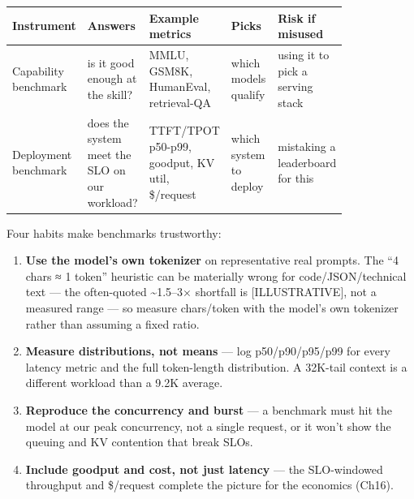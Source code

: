 \nopagebreak[4]
\begin{longtable}[]{@{}
  >{\raggedright\arraybackslash}p{0.1647\linewidth}
  >{\raggedright\arraybackslash}p{0.1647\linewidth}
  >{\raggedright\arraybackslash}p{0.1647\linewidth}
  >{\raggedright\arraybackslash}p{0.1647\linewidth}
  >{\raggedright\arraybackslash}p{0.1647\linewidth}@{}}
\toprule\noalign{}
\begin{minipage}[b]{\linewidth}\raggedright
Instrument
\end{minipage} & \begin{minipage}[b]{\linewidth}\raggedright
Answers
\end{minipage} & \begin{minipage}[b]{\linewidth}\raggedright
Example metrics
\end{minipage} & \begin{minipage}[b]{\linewidth}\raggedright
Picks
\end{minipage} & \begin{minipage}[b]{\linewidth}\raggedright
Risk if misused
\end{minipage} \\
\midrule\noalign{}
\endhead
\bottomrule\noalign{}
\endlastfoot
Capability benchmark & is it good enough at the skill? & MMLU, GSM8K,
HumanEval, retrieval-QA & which models qualify & using it to pick a
serving stack \\
\noalign{\label{tab:14.1}}
Deployment benchmark & does the system meet the SLO on our workload? &
TTFT/TPOT p50-p99, goodput, KV util, \$/request & which system to deploy
& mistaking a leaderboard for this \\
\end{longtable}

\label{measurement}


Four habits make benchmarks trustworthy:

\begin{enumerate}
\def\labelenumi{\arabic{enumi}.}
\tightlist
\item
  \textbf{Use the model's own tokenizer} on representative real prompts.
  The ``4 chars ≈ 1 token'' heuristic can be materially wrong for
  code/JSON/technical text --- the often-quoted \textasciitilde1.5--3×
  shortfall is \mbox{{[}ILLUSTRATIVE{]}}, not a measured range --- so measure
  chars/token with the model's own tokenizer rather than assuming a
  fixed ratio.
\item
  \textbf{Measure distributions, not means} --- log p50/p90/p95/p99 for
  every latency metric and the full token-length distribution. A
  32K-tail context is a different workload than a 9.2K average.
\item
  \textbf{Reproduce the concurrency and burst} --- a benchmark must hit
  the model at our peak concurrency, not a single request, or it won't
  show the queuing and KV contention that break SLOs.
\item
  \textbf{Include goodput and cost, not just latency} --- the
  SLO-windowed throughput and \$/request complete the picture for the
  economics (Ch16).
\end{enumerate}


